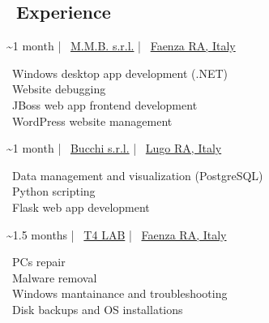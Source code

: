 \documentclass{article}
\begin{document}
\begin{paracol}{2}
%
%

\vfill

\section*{\faBriefcase \ Experience}

\begin{tcolorbox}[title=\faLaptopCode \ Software Developer Internship]
     \textasciitilde 1 month \hfill | \hfill
    \faBuilding \ \href{https://www.mmbsoftware.it/portalemmb/en/home}{M.M.B. s.r.l.} \hfill | \hfill
    \faCity \ \href{https://www.openstreetmap.org/relation/43004}{Faenza RA, Italy}

    \tcblower

    \faDesktop \ Windows desktop app development (.NET) \\
    \faBug \ Website debugging \\
    \faCoffee \ JBoss web app frontend development \\
    \faWordpress \ WordPress website management
\end{tcolorbox}

\begin{tcolorbox}[title=\faLaptopCode \ Software Developer Internship]
     \textasciitilde 1 month \hfill | \hfill
    \faIndustry \ \href{http://www.bucchi.it/en/}{Bucchi s.r.l.} \hfill | \hfill
    \faCity \ \href{https://www.openstreetmap.org/relation/43140}{Lugo RA, Italy}

    \tcblower

    \faDatabase \ Data management and visualization (PostgreSQL) \\
    \faPython \ Python scripting \\
    \faFlask \ Flask web app development
\end{tcolorbox}

\begin{tcolorbox}[title=\faTools \ Computer Technician Internship]
     \textasciitilde 1.5 months \hfill | \hfill
    \faBuilding \ \href{https://www.t4lab.it/}{T4 LAB} \hfill | \hfill
    \faCity \ \href{https://www.openstreetmap.org/relation/43004}{Faenza RA, Italy}

    \tcblower

    \faLaptop \ PCs repair \\
    \faShieldVirus \ Malware removal \\
    \faRecycle \ Windows mantainance and troubleshooting \\
    \faHdd \ Disk backups and OS installations
\end{tcolorbox}

\end{paracol}
\end{document}
